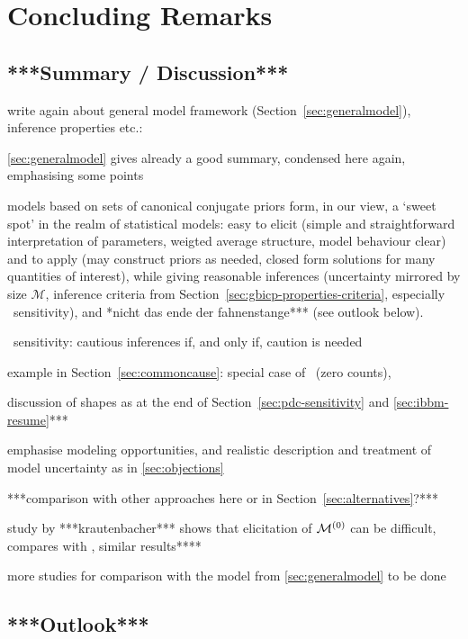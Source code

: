 \chapter{Concluding Remarks}
\label{cha:concluding}


\section{***Summary / Discussion***}

write again about general model framework (Section~\ref{sec:generalmodel}),
inference properties etc.:

\ref{sec:generalmodel} gives already a good summary, condensed here again, emphasising some points


models based on sets of canonical conjugate priors form, in our view,
a `sweet spot' in the realm of statistical models:
easy to elicit (simple and straightforward interpretation of parameters,
weigted average structure, model behaviour clear)
and to apply (may construct priors as needed, closed form solutions for many quantities of interest),
while giving reasonable inferences (uncertainty mirrored by size $\mathcal{M}$,
inference criteria from Section~\ref{sec:gbicp-properties-criteria}, especially \pdc\ sensitivity),
and *nicht das ende der fahnenstange*** (see outlook below).

\pdc\ sensitivity: cautious inferences if, and only if, caution is needed

example in Section~\ref{sec:commoncause}: special case of \pdc\ (zero counts),


discussion of shapes as at the end of Section~\ref{sec:pdc-sensitivity} and \ref{sec:ibbm-resume}***

emphasise modeling opportunities, and realistic description and treatment
of model uncertainty as in \ref{sec:objections}




***comparison with other approaches here or in Section~\ref{sec:alternatives}?***

study by ***krautenbacher*** shows that elicitation of $\mathcal{M}^{(0)}$ can be difficult,
compares with \textcite{2005:whitcomb}, similar results****

more studies for comparison with the model from \ref{sec:generalmodel} to be done







\section{***Outlook***}

